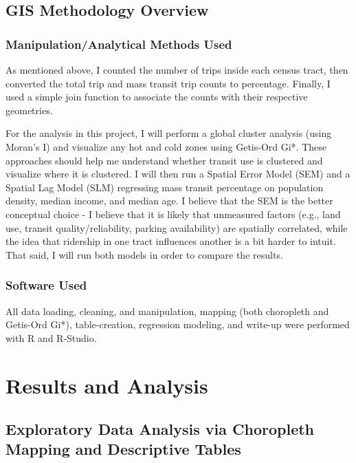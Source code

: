 \documentclass[
]{article}
\begin{document}
\subsection{GIS Methodology Overview}\label{gis-methodology-overview}

\subsubsection{Manipulation/Analytical Methods
Used}\label{manipulationanalytical-methods-used}

As mentioned above, I counted the number of trips inside each census
tract, then converted the total trip and mass transit trip counts to
percentage. Finally, I used a simple join function to associate the
counts with their respective geometries.

For the analysis in this project, I will perform a global cluster
analysis (using Moran's I) and visualize any hot and cold zones using
Getis-Ord Gi*. These approaches should help me understand whether
transit use is clustered and visualize where it is clustered. I will
then run a Spatial Error Model (SEM) and a Spatial Lag Model (SLM)
regressing mass transit percentage on population density, median income,
and median age. I believe that the SEM is the better conceptual choice -
I believe that it is likely that unmeasured factors (e.g., land use,
transit quality/reliability, parking availability) are spatially
correlated, while the idea that ridership in one tract influences
another is a bit harder to intuit. That said, I will run both models in
order to compare the results.

\subsubsection{Software Used}\label{software-used}

All data loading, cleaning, and manipulation, mapping (both choropleth
and Getis-Ord Gi*), table-creation, regression modeling, and write-up
were performed with R and R-Studio.

\newpage

\section{Results and Analysis}\label{results-and-analysis}

\subsection{Exploratory Data Analysis via Choropleth Mapping and
Descriptive
Tables}\label{exploratory-data-analysis-via-choropleth-mapping-and-descriptive-tables}
\end{document}
